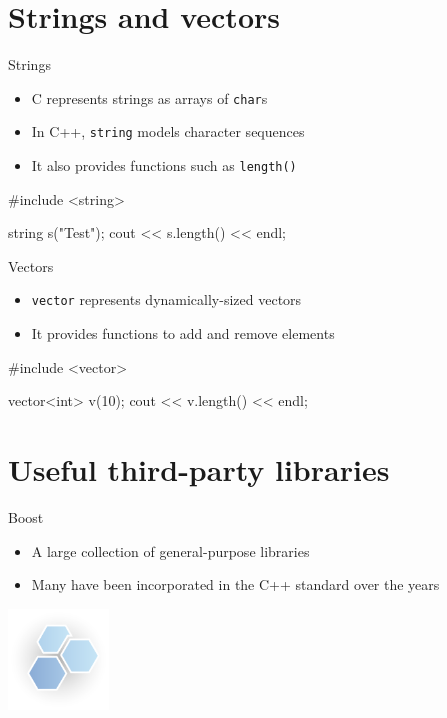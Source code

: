 \section{Strings and vectors}

\begin{frame}[fragile]{Strings}
    \begin{itemize}
        \item C represents strings as arrays of \texttt{char}s
        \item In C++, \texttt{string} models character sequences
        \item It also provides functions such as \texttt{length()}
    \end{itemize}
    \begin{cpp}
        #include <string>

        string s("Test");
        cout << s.length() << endl;
    \end{cpp}
\end{frame}

\begin{frame}[fragile]{Vectors}
    \begin{itemize}
        \item \texttt{vector} represents dynamically\hyp{}sized vectors
        \item It provides functions to add and remove elements
    \end{itemize}
    \begin{cpp}
        #include <vector>

        vector<int> v(10);
        cout << v.length() << endl;
    \end{cpp}
\end{frame}

\section{Useful third-party libraries}

\begin{frame}{Boost}
    \begin{itemize}
        \item A large collection of general\hyp{}purpose libraries
        \item Many have been incorporated in the C++ standard over the years
    \end{itemize}
    \begin{flushright}
        \includegraphics[width=0.2\textwidth]{figures/boost}
    \end{flushright}
    \vspace{-2em}
\end{frame}

